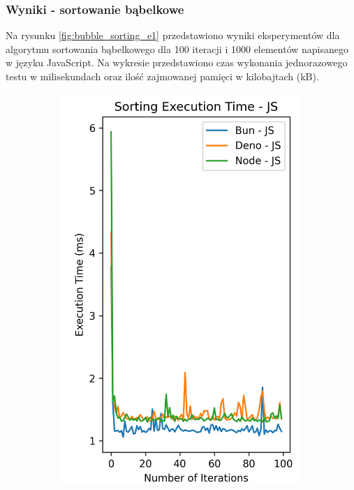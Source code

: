 \subsubsection{Wyniki - sortowanie bąbelkowe}
Na rysunku \ref{fig:bubble_sorting_e1} przedstawiono wyniki eksperymentów dla algorytmu sortowania bąbelkowego dla 100 iteracji i 1000 elementów napisanego w języku JavaScript. Na wykresie przedstawiono czas wykonania jednorazowego testu w milisekundach oraz ilość zajmowanej pamięci w kilobajtach (kB).

\begin{figure}[H]
  \centering
  \begin{subfigure}[b]{0.4\textwidth}
    \centering
    \includegraphics[width=\textwidth]{Figures/sorting/sorting_bubble_100_1000_js_time.png}

\end{subfigure}
\end{figure}
